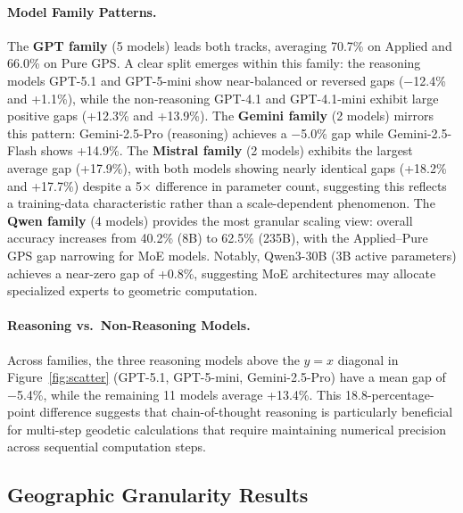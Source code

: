 \paragraph{Model Family Patterns.}
The \textbf{GPT family} (5 models) leads both tracks, averaging 70.7\% on Applied and 66.0\% on Pure GPS. A clear split emerges within this family: the reasoning models GPT-5.1 and GPT-5-mini show near-balanced or reversed gaps ($-$12.4\% and +1.1\%), while the non-reasoning GPT-4.1 and GPT-4.1-mini exhibit large positive gaps (+12.3\% and +13.9\%). The \textbf{Gemini family} (2 models) mirrors this pattern: Gemini-2.5-Pro (reasoning) achieves a $-$5.0\% gap while Gemini-2.5-Flash shows +14.9\%. The \textbf{Mistral family} (2 models) exhibits the largest average gap (+17.9\%), with both models showing nearly identical gaps (+18.2\% and +17.7\%) despite a 5$\times$ difference in parameter count, suggesting this reflects a training-data characteristic rather than a scale-dependent phenomenon. The \textbf{Qwen family} (4 models) provides the most granular scaling view: overall accuracy increases from 40.2\% (8B) to 62.5\% (235B), with the Applied--Pure GPS gap narrowing for MoE models. Notably, Qwen3-30B (3B active parameters) achieves a near-zero gap of +0.8\%, suggesting MoE architectures may allocate specialized experts to geometric computation.

\paragraph{Reasoning vs.\ Non-Reasoning Models.}
Across families, the three reasoning models above the $y = x$ diagonal in Figure~\ref{fig:scatter} (GPT-5.1, GPT-5-mini, Gemini-2.5-Pro) have a mean gap of $-$5.4\%, while the remaining 11 models average +13.4\%. This 18.8-percentage-point difference suggests that chain-of-thought reasoning is particularly beneficial for multi-step geodetic calculations that require maintaining numerical precision across sequential computation steps.

\subsection{Geographic Granularity Results}
\label{app:granularity_full}

